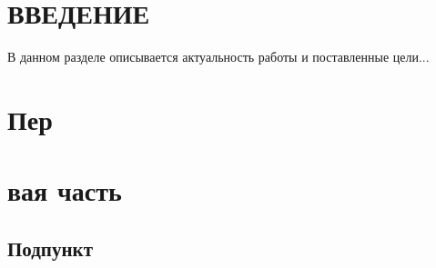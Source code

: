 \documentclass[paper=a4, fontsize=14pt, pagesize, DIV=calc, oneside]{scrreport}
\begin{document}
\pagestyle{empty} 



\newpage
\tableofcontents
\newpage

\pagestyle{plain}
\setcounter{page}{2} 



\chapter*{ВВЕДЕНИЕ}











В данном разделе описывается актуальность работы и поставленные цели...





\chapter{Пер}












\chapter{вая часть}














\section{Подпункт}
\end{document}
